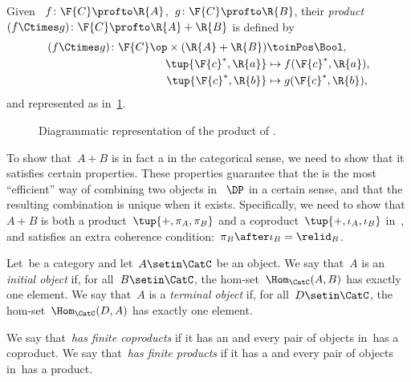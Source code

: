 \begin{definition}
    \label{def:product-dp}
    Given ~$f\colon \F{C} \profto \R{A}$,~$g \colon \F{C} \profto \R{B}$, their \emph{product}~$(f \Ctimes g)\colon \F{C} \profto \R{A} + \R{B}$ is defined by
    \begin{equation}
        \begin{aligned}
            (f \Ctimes g)
            \colon \F{C}\op  \times (\R{A} + \R{B}) & \toinPos \Bool, \\
            \tup{\F{c}^*, \R{a}}                    & \mapsto f(\F{c}^*, \R{a}), \\
            \tup{\F{c}^*, \R{b}}                    & \mapsto g(\F{c}^*, \R{b}),
        \end{aligned}
    \end{equation}
    and represented as in~\cref{fig:productdp}.
\end{definition}

\begin{figure}[h!]
    \centering
    \caption{Diagrammatic representation of the product of . }
    \label{fig:productdp}
\end{figure}

To show that~$A + B$ is in fact a  in the categorical sense, we need to show that it satisfies certain properties.
These properties guarantee that the  is the most ``efficient'' way of combining two objects in~$~\DP$ in a certain sense, and that the resulting combination is unique when it exists.
Specifically, we need to show that~$A + B$ is both a product~$\tup{+, \pi_A, \pi_B}$ and a coproduct~$\tup{+, \iota_A, \iota_B}$ in~\DP, and satisfies an extra coherence condition:~$\pi_B \after \iota_B = \relid_B$.

\begin{ctdefinition}
    \label{def:initial-terminal-object}
    Let~\CatC be a category and let~$A \setin \CatC$ be an object.
    We say that~$A$ is an \emph{initial object} if, for all~$B \setin\CatC$, the hom-set~$\Hom_\CatC(A,B)$ has exactly one element.
    We say that~$A$ is a \emph{terminal object} if, for all~$D\setin\CatC$, the hom-set~$\Hom_\CatC(D,A)$ has exactly one element.
\end{ctdefinition}

\begin{ctdefinition}
    \label{def:finite-products}
    We say that~\CatC \emph{has finite coproducts} if it has an  and every pair of objects in~\CatC has a coproduct.
    We say that~\CatC \emph{has finite products} if it has a  and every pair of objects in~\CatC has a product.
\end{ctdefinition}


